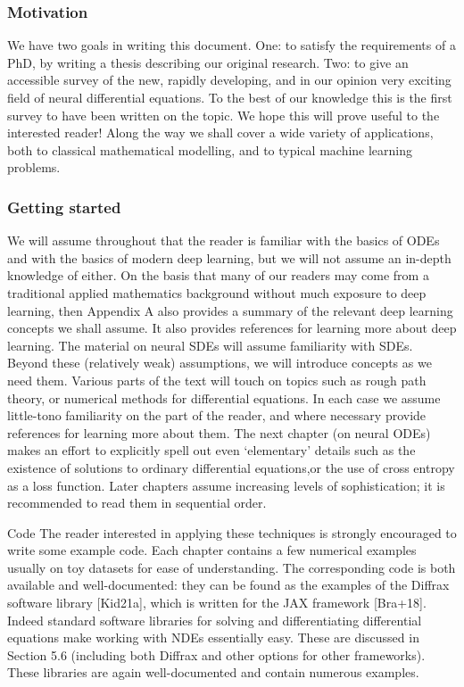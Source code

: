 \subsubsection*{Motivation}

We have two goals in writing this document. One: to satisfy the requirements of a
PhD, by writing a thesis describing our original research. Two: to give an accessible
survey of the new, rapidly developing, and in our opinion very exciting field of neural
differential equations. To the best of our knowledge this is the first survey to have
been written on the topic.
We hope this will prove useful to the interested reader! Along the way we shall cover a
wide variety of applications, both to classical mathematical modelling, and to typical
machine learning problems.


\subsubsection*{Getting started}
We will assume throughout that the reader is familiar with the basics
of ODEs and with the basics of modern deep learning, but we will not assume an
in-depth knowledge of either. On the basis that many of our readers may come from a
traditional applied mathematics background without much exposure to deep learning,
then Appendix A also provides a summary of the relevant deep learning concepts we
shall assume. It also provides references for learning more about deep learning.
The material on neural SDEs will assume familiarity with SDEs.
Beyond these (relatively weak) assumptions, we will introduce concepts as we need
them. Various parts of the text will touch on topics such as rough path theory,
or numerical methods for differential equations. In each case we assume little-tono
familiarity on the part of the reader, and where necessary provide references for
learning more about them.
The next chapter (on neural ODEs) makes an effort to explicitly spell out even `elementary'
details such as the existence of solutions to ordinary differential equations,or the use of cross entropy as a loss function. Later chapters assume increasing levels
of sophistication; it is recommended to read them in sequential order.

Code The reader interested in applying these techniques is strongly encouraged to
write some example code.
Each chapter contains a few numerical examples usually on toy datasets for ease
of understanding. The corresponding code is both available and well-documented:
they can be found as the examples of the Diffrax software library [Kid21a], which is
written for the JAX framework [Bra+18].
Indeed standard software libraries for solving and differentiating differential equations
make working with NDEs essentially easy. These are discussed in Section 5.6
(including both Diffrax and other options for other frameworks). These libraries are
again well-documented and contain numerous examples.


